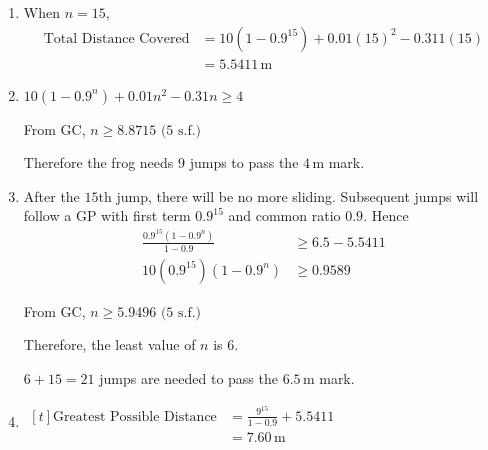 \documentclass[11pt,a4paper]{book}
\begin{document}
\begin{example}
\begin{enumerate}[label=(\alph*)]
\item  When $n=15$, 
\begin{align*}
\text{Total Distance Covered} & =10\left(1-0.9^{15}\right)+0.01\left(15\right)^{2}-0.311\left(15\right)\\
 & =5.5411\,\text{m}
\end{align*}

\item  $10\left(1-0.9^{n}\right)+0.01n^{2}-0.31n\geq4$

From GC, $n\geq8.8715\text{ (5 s.f.)}$

Therefore the frog needs $9$ jumps to pass the $4\,\text{m}$ mark.

\item  After the $15\text{th}$ jump, there will be no more sliding.
Subsequent jumps will follow a GP with first term $0.9^{15}$ and
common ratio $0.9$. Hence 
\begin{align*}
\frac{0.9^{15}\left(1-0.9^{n}\right)}{1-0.9} & \geq6.5-5.5411\\
10\left(0.9^{15}\right)\left(1-0.9^{n}\right) & \geq0.9589
\end{align*}

From GC, $n\geq5.9496\text{ (5 s.f.)}$

Therefore, the least value of $n$ is $6$.

$6+15=21$ jumps are needed to pass the $6.5\,\text{m}$ mark.

\item 
$
\begin{aligned}[t]
\text{Greatest Possible Distance} & =\frac{9^{15}}{1-0.9}+5.5411\\
 & =7.60\,\text{m}
\end{aligned}
$

\end{enumerate}

\end{example}
\end{document}
